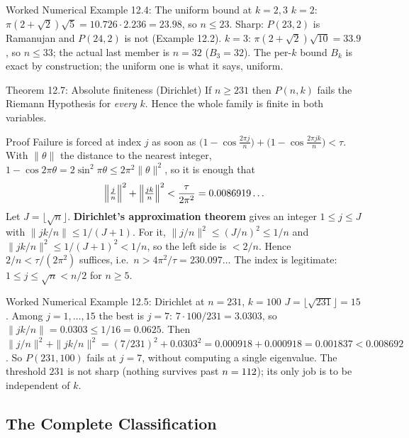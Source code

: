 \documentclass[11pt]{article}
\begin{document}
\begin{callbox}{Worked Numerical Example 12.4: The uniform bound at $k=2,3$}
$k=2$: $\pi(2+\sqrt2)\sqrt5=10.726\cdot2.236=23.98$, so $n\le23$. Sharp: $P(23,2)$ is Ramanujan and $P(24,2)$ is not (Example 12.2). $k=3$: $\pi(2+\sqrt2)\sqrt{10}=33.9$, so $n\le33$; the actual last member is $n=32$ ($B_3=32$). The per-$k$ bound $B_k$ is exact by construction; the uniform one is what it says, uniform.
\end{callbox}

\begin{thmbox}{Theorem 12.7: Absolute finiteness (Dirichlet)}
If $n\ge231$ then $P(n,k)$ fails the Riemann Hypothesis for \emph{every} $k$. Hence the whole family is finite in both variables.
\end{thmbox}

\begin{defbox}{Proof}
Failure is forced at index $j$ as soon as $\bigl(1-\cos\frac{2\pi j}{n}\bigr)+\bigl(1-\cos\frac{2\pi jk}{n}\bigr)<\tau$. With $\|\theta\|$ the distance to the nearest integer, $1-\cos2\pi\theta=2\sin^2\pi\theta\le2\pi^2\|\theta\|^2$, so it is enough that
\begin{equation}
  \Bigl\|\tfrac jn\Bigr\|^2+\Bigl\|\tfrac{jk}{n}\Bigr\|^2<\frac{\tau}{2\pi^2}=0.0086919\ldots
\end{equation}
Let $J=\lfloor\sqrt n\rfloor$. \textbf{Dirichlet's approximation theorem} gives an integer $1\le j\le J$ with $\|jk/n\|\le1/(J+1)$. For it, $\|j/n\|^2\le(J/n)^2\le1/n$ and $\|jk/n\|^2\le1/(J+1)^2<1/n$, so the left side is $<2/n$. Hence $2/n<\tau/(2\pi^2)$ suffices, i.e.\ $n>4\pi^2/\tau=230.097\ldots$ The index is legitimate: $1\le j\le\sqrt n<n/2$ for $n\ge5$. \qedhere
\end{defbox}

\begin{callbox}{Worked Numerical Example 12.5: Dirichlet at $n=231$, $k=100$}
$J=\lfloor\sqrt{231}\rfloor=15$. Among $j=1,\dots,15$ the best is $j=7$: $7\cdot100/231=3.0303$, so $\|jk/n\|=0.0303\le1/16=0.0625$. Then $\|j/n\|^2+\|jk/n\|^2=(7/231)^2+0.0303^2=0.000918+0.000918=0.001837<0.008692$. So $P(231,100)$ fails at $j=7$, without computing a single eigenvalue. The threshold $231$ is not sharp (nothing survives past $n=112$); its only job is to be independent of $k$.
\end{callbox}

\subsection{The Complete Classification}
\end{document}
